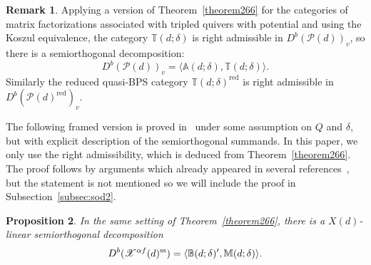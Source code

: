 \documentclass [11pt,oneside,a4paper,mathscr]{amsart}
\newtheorem{thm}{Theorem}[section]
\newtheorem{prop}[thm]{Proposition}
\theoremstyle{definition}
\newtheorem{remark}[thm]{Remark}
\newcommand{\X}{\mathscr{X}}
\begin{document}
\begin{remark}\label{rmk:version}
    Applying a version of Theorem~\ref{theorem266}
    for the categories of matrix factorizations associated with 
    tripled quivers with potential and 
    using the Koszul equivalence, the category $\mathbb{T}(d; \delta)$ is right admissible in $D^b(\mathscr{P}(d))_v$, so there is a semiorthogonal decomposition:
\begin{equation}\label{SODtheorem266Pd}
D^b(\mathscr{P}(d))_v=\langle \mathbb{A}(d; \delta), \mathbb{T}(d; \delta)\rangle.
\end{equation}
Similarly the reduced quasi-BPS category $\mathbb{T}(d; \delta)^{\mathrm{red}}$ is
right admissible in $D^b(\mathscr{P}(d)^{\mathrm{red}})_v$. 
\end{remark}

The following framed version is proved in~\cite{PTquiver} 
under some assumption on $Q$ and $\delta$, but with explicit description 
of the semiorthogonal summands. In this paper, we only use the right admissibility, 
which is deduced from Theorem~\ref{theorem266}.
The proof follows by arguments which already appeared in several 
references~\cite{PTzero, T, KoTo, PTquiver}, but
the statement is not mentioned so we will include the proof in 
Subsection~\ref{subsec:sod2}. 
\begin{prop}\label{prop226}
    In the same setting of Theorem~\ref{theorem266}, 
    there is a $X(d)$-linear semiorthogonal decomposition 
    \begin{align*}
        D^b(\X^{\alpha f}(d)^{\rm{ss}})=\langle \mathbb{B}(d; \delta)', \mathbb{M}(d; \delta) \rangle. 
    \end{align*}
\end{prop}


\end{document}
